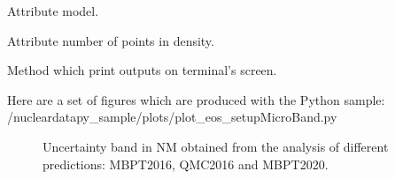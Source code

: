 \documentclass[letterpaper,10pt,english]{sphinxmanual}
\begin{document}
\begin{fulllineitems}
\begin{fulllineitems}
\end{fulllineitems}


\begin{fulllineitems}
\label{\detokenize{source/api/setup_eos_micro_band:nucleardatapy.eos.setup_micro_band.setupMicroBand.models}}
\pysigstartsignatures
{}
\pysigstopsignatures
\sphinxAtStartPar
Attribute model.

\end{fulllineitems}


\begin{fulllineitems}
\label{\detokenize{source/api/setup_eos_micro_band:nucleardatapy.eos.setup_micro_band.setupMicroBand.nden}}
\pysigstartsignatures
{}
\pysigstopsignatures
\sphinxAtStartPar
Attribute number of points in density.

\end{fulllineitems}


\begin{fulllineitems}
\label{\detokenize{source/api/setup_eos_micro_band:nucleardatapy.eos.setup_micro_band.setupMicroBand.print_outputs}}
\pysigstartsignatures
{}
\pysigstopsignatures
\sphinxAtStartPar
Method which print outputs on terminal’s screen.

\end{fulllineitems}


\end{fulllineitems}


\sphinxAtStartPar
Here are a set of figures which are produced with the Python sample: /nucleardatapy\_sample/plots/plot\_eos\_setupMicroBand.py

\begin{figure}[htbp]
\centering
\capstart

\noindent{}
\caption{Uncertainty band in NM obtained from the analysis of different predictions: MBPT\sphinxhyphen{}2016, QMC\sphinxhyphen{}2016 and MBPT\sphinxhyphen{}2020.}\label{\detokenize{source/api/setup_eos_micro_band:id1}}\end{figure}
\end{document}
